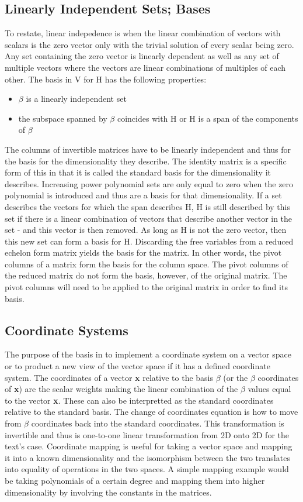 \documentclass[12pt]{article}
\begin{document}
\subsection{Linearly Independent Sets; Bases}
To restate, linear indepedence is when the linear combination of vectors with scalars is the zero vector only with the trivial 
solution of every scalar being zero. Any set containing the zero vector is linearly dependent as well as any set of multiple 
vectors where the vectors are linear combinations of multiples of each other. The basis in V for H has the following properties:
\begin{itemize}
    \item $\beta$ is a linearly independent set
    \item the subspace spanned by $\beta$ coincides with H or H is a span of the components of $\beta$ 
\end{itemize}
The columns of invertible matrices have to be linearly independent and thus for the basis for the dimensionality they describe. The identity 
matrix is a specific form of this in that it is called the standard basis for the dimensionality it describes. Increasing power polynomial 
sets are only equal to zero when the zero polynomial is introduced and thus are a basis for that dimensionality. If a set describes the 
vectors for which the span describes H, H is still described by this set if there is a linear combination of vectors that describe another 
vector in the set - and this vector is then removed. As long as H is not the zero vector, then this new set can form a basis for H. 
Discarding the free variables from a reduced echelon form matrix yields the basis for the matrix. In other words, the pivot columns of 
a matrix form the basis for the column space. The pivot columns of the reduced matrix do not form the basis, however, of the original
matrix. The pivot columns will need to be applied to the original matrix in order to find its basis. 
\subsection{Coordinate Systems}
The purpose of the basis in to implement a coordinate system on a vector space or to product a new view of the vector space if it has a 
defined coordinate system. The coordinates of a vector \textbf{x} relative to the basis $\beta$ (or the $\beta$ coordinates of \textbf{x}) are 
the scalar weights making the linear combination of the $\beta$ values equal to the vector \textbf{x}. These can also be interpretted as the 
standard coordinates relative to the standard basis. The change of coordinates equation is how to move from $\beta$ coordinates back into 
the standard coordinates. This transformation is invertible and thus is one-to-one linear transformation from 2D onto 2D for the text's 
case. Coordinate mapping is useful for taking a vector space and mapping it into a known dimensionality and the isomorphism between the 
two translates into equality of operations in the two spaces. A simple mapping example would be taking polynomials of a certain degree and 
mapping them into higher dimensionality by involving the constants in the matrices. 
\end{document}
